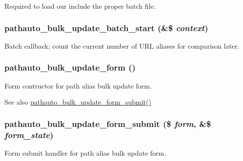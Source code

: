 Required to load our include the proper batch file. \hypertarget{pathauto_8admin_8inc_a7d546d06b26c9c05c3d69e74b729afc2}{
\subsubsection[{pathauto\_\-bulk\_\-update\_\-batch\_\-start}]{\setlength{\rightskip}{0pt plus 5cm}pathauto\_\-bulk\_\-update\_\-batch\_\-start (\&\$ {\em context})}}
\label{pathauto_8admin_8inc_a7d546d06b26c9c05c3d69e74b729afc2}
Batch callback; count the current number of URL aliases for comparison later. \hypertarget{pathauto_8admin_8inc_adbfac53f8f52a25ad1d4b1a59bf8b907}{
\subsubsection[{pathauto\_\-bulk\_\-update\_\-form}]{\setlength{\rightskip}{0pt plus 5cm}pathauto\_\-bulk\_\-update\_\-form ()}}
\label{pathauto_8admin_8inc_adbfac53f8f52a25ad1d4b1a59bf8b907}
Form contructor for path alias bulk update form.

\begin{DoxySeeAlso}{See also}
\hyperlink{pathauto_8admin_8inc_a34661ac29b8c6d623ed9437ad194cfa4}{pathauto\_\-bulk\_\-update\_\-form\_\-submit()} 
\end{DoxySeeAlso}
\hypertarget{pathauto_8admin_8inc_a34661ac29b8c6d623ed9437ad194cfa4}{
\subsubsection[{pathauto\_\-bulk\_\-update\_\-form\_\-submit}]{\setlength{\rightskip}{0pt plus 5cm}pathauto\_\-bulk\_\-update\_\-form\_\-submit (\$ {\em form}, \/  \&\$ {\em form\_\-state})}}
\label{pathauto_8admin_8inc_a34661ac29b8c6d623ed9437ad194cfa4}
Form submit handler for path alias bulk update form.

